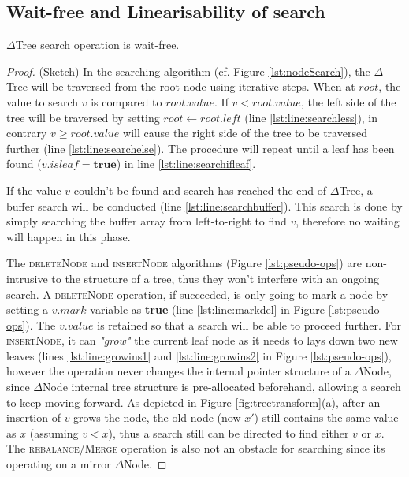 \subsection{Wait-free and Linearisability of search}

\begin{lemma}
$\Delta$Tree search operation is wait-free.
\end{lemma}

\begin{proof}(Sketch) In the searching algorithm (cf. Figure
\ref{lst:nodeSearch}), the $\Delta$Tree will be traversed from the root node
using iterative steps. When at $root$, the value to search $v$ is compared to
$root.value$. If $v < root.value$, the left side of the tree will be traversed
by setting $root \gets root.left$ (line \ref{lst:line:searchless}), in contrary
$v \geqslant root.value$ will cause the right side of the tree to be traversed
further (line \ref{lst:line:searchelse}). The procedure will repeat until a leaf
has been found ($v.isleaf = \textbf{true}$) in line \ref{lst:line:searchifleaf}.

If the value $v$ couldn't be found and search has reached the end of 
$\Delta$Tree, a buffer search will be conducted
(line \ref{lst:line:searchbuffer}).
This search is done by simply searching the buffer array from left-to-right
to find $v$, therefore no waiting will happen in this phase.

The \textsc{deleteNode} and \textsc{insertNode} algorithms (Figure
\ref{lst:pseudo-ops}) are non-intrusive to the structure of a tree, thus they
won't interfere with an ongoing search. A \textsc{deleteNode} operation, if
succeeded, is only going to mark a node by setting a $v.mark$ variable as
\textbf{true} (line \ref{lst:line:markdel} in Figure \ref{lst:pseudo-ops}).
The $v.value$ is retained so that a search will be able to proceed further.
For \textsc{insertNode}, it can \textit{"grow"} the current leaf node as it
needs to lays down two new leaves (lines  \ref{lst:line:growins1} and
\ref{lst:line:growins2} in Figure \ref{lst:pseudo-ops}), however the operation
never changes the internal pointer structure of a $\Delta$Node, since
$\Delta$Node internal tree structure is pre-allocated beforehand, allowing a
search to keep moving forward.
As depicted in Figure \ref{fig:treetransform}(a), after an insertion of $v$
grows the node, the old node (now $x'$) still contains the same value as $x$
(assuming $v < x$), thus a search still can be directed to find either $v$ or
$x$.
 The \textsc{rebalance/Merge} operation is also not an obstacle for searching
 since its operating on a mirror $\Delta$Node.
\end{proof}

